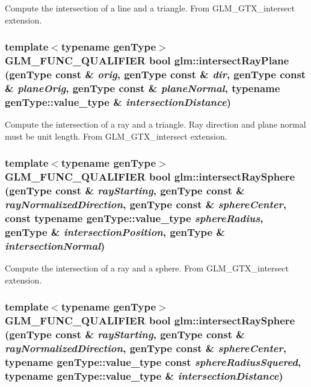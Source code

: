 Compute the intersection of a line and a triangle. From GLM\_\-GTX\_\-intersect extension. \hypertarget{group__gtx__intersect_g1699af184f5244ebe224fd653dd0bfc0}{
\subsubsection[intersectRayPlane]{\setlength{\rightskip}{0pt plus 5cm}template$<$typename genType$>$ GLM\_\-FUNC\_\-QUALIFIER bool glm::intersectRayPlane (genType const \& {\em orig}, \/  genType const \& {\em dir}, \/  genType const \& {\em planeOrig}, \/  genType const \& {\em planeNormal}, \/  typename genType::value\_\-type \& {\em intersectionDistance})}}
\label{group__gtx__intersect_g1699af184f5244ebe224fd653dd0bfc0}


Compute the intersection of a ray and a triangle. Ray direction and plane normal must be unit length. From GLM\_\-GTX\_\-intersect extension. \hypertarget{group__gtx__intersect_g2e6a97dd3fcdbf83c24dd3499f81014b}{
\subsubsection[intersectRaySphere]{\setlength{\rightskip}{0pt plus 5cm}template$<$typename genType$>$ GLM\_\-FUNC\_\-QUALIFIER bool glm::intersectRaySphere (genType const \& {\em rayStarting}, \/  genType const \& {\em rayNormalizedDirection}, \/  genType const \& {\em sphereCenter}, \/  const typename genType::value\_\-type {\em sphereRadius}, \/  genType \& {\em intersectionPosition}, \/  genType \& {\em intersectionNormal})}}
\label{group__gtx__intersect_g2e6a97dd3fcdbf83c24dd3499f81014b}


Compute the intersection of a ray and a sphere. From GLM\_\-GTX\_\-intersect extension. \hypertarget{group__gtx__intersect_g95b17f6f08015c92fc8ac3e83010492d}{
\subsubsection[intersectRaySphere]{\setlength{\rightskip}{0pt plus 5cm}template$<$typename genType$>$ GLM\_\-FUNC\_\-QUALIFIER bool glm::intersectRaySphere (genType const \& {\em rayStarting}, \/  genType const \& {\em rayNormalizedDirection}, \/  genType const \& {\em sphereCenter}, \/  typename genType::value\_\-type const {\em sphereRadiusSquered}, \/  typename genType::value\_\-type \& {\em intersectionDistance})}}
\label{group__gtx__intersect_g95b17f6f08015c92fc8ac3e83010492d}


